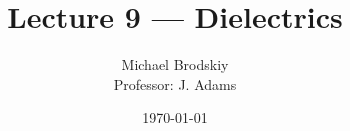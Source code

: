 


\title{Lecture 9 — Dielectrics}
\date{\today}
\author{Michael Brodskiy\\ \small Professor: J. Adams}



\maketitle

